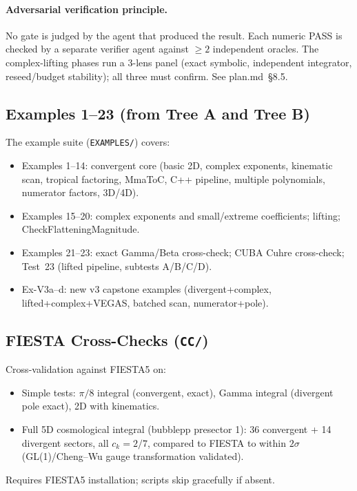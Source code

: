 \documentclass[11pt,a4paper]{article}
\begin{document}
\paragraph{Adversarial verification principle.} No gate is judged by the agent that produced the result. Each numeric PASS is checked by a separate verifier agent against $\geq 2$ independent oracles. The complex-lifting phases run a 3-lens panel (exact symbolic, independent integrator, reseed/budget stability); all three must confirm. See plan.md~\S8.5.

\subsection{Examples 1--23 (from Tree A and Tree B)}

The example suite (\texttt{EXAMPLES/}) covers:
\begin{itemize}
  \item Examples 1--14: convergent core (basic 2D, complex exponents, kinematic scan, tropical factoring, MmaToC, C++ pipeline, multiple polynomials, numerator factors, 3D/4D).
  \item Examples 15--20: complex exponents and small/extreme coefficients; lifting; CheckFlatteningMagnitude.
  \item Examples 21--23: exact Gamma/Beta cross-check; CUBA Cuhre cross-check; Test~23 (lifted pipeline, subtests A/B/C/D).
  \item Ex-V3a--d: new v3 capstone examples (divergent+complex, lifted+complex+VEGAS, batched scan, numerator+pole).
\end{itemize}

\subsection{FIESTA Cross-Checks (\texttt{CC/})}

Cross-validation against FIESTA5 on:
\begin{itemize}
  \item Simple tests: $\pi/8$ integral (convergent, exact), Gamma integral (divergent pole exact), 2D with kinematics.
  \item Full 5D cosmological integral (bubblepp presector 1): 36 convergent + 14 divergent sectors, all $c_k=2/7$, compared to FIESTA to within $2\sigma$ (GL(1)/Cheng--Wu gauge transformation validated).
\end{itemize}
Requires FIESTA5 installation; scripts skip gracefully if absent.
\end{document}
